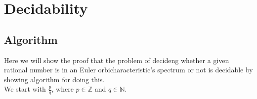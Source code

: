 \chapter{Decidability}

\section{Algorithm}
Here we will show the proof that the problem of decideng whether a given rational number is in an 
Euler orbicharacteristic's spectrum or not is decidable by showing algorithm for doing this. \\
We start with $\frac{p}{q}$, where $p \in \mathbb{Z}$ and $q \in \mathbb{N}$. 
